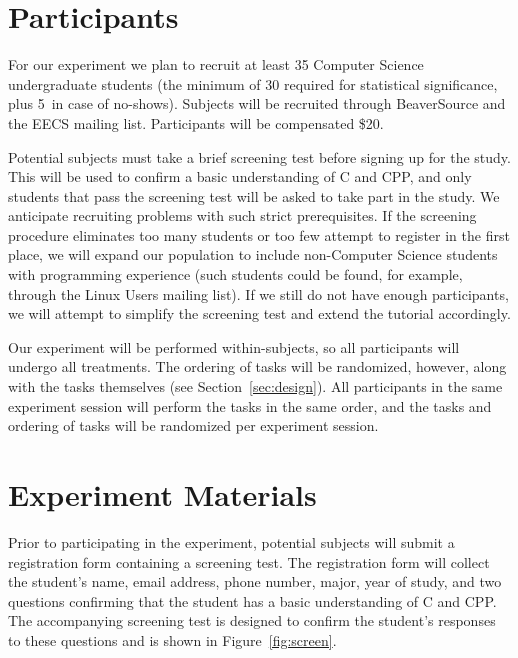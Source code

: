 \documentclass[11pt]{article}
\begin{document}
	
	\section{Participants}
	\label{sec:participants}
	
	For our experiment we plan to recruit at least 35 Computer Science
	undergraduate students (the minimum of 30 required for statistical
	significance, plus 5\ in case of no-shows).  Subjects will be recruited through
	BeaverSource and the EECS mailing list.  Participants will be compensated \$20.
	
	Potential subjects must take a brief screening test before signing up for the
	study.  This will be used to confirm a basic understanding of C and CPP, and
	only students that pass the screening test will be asked to take part in the
	study.
	We anticipate recruiting problems with such strict prerequisites.  If the
	screening procedure eliminates too many students or too few attempt to register
	in the first place, we will expand our population to include non-Computer
	Science students with programming experience (such students could be found, for
	example, through the Linux Users mailing list).  If we still do not have enough
	participants, we will attempt to simplify the screening test and extend the
	tutorial accordingly.
	
	Our experiment will be performed within-subjects, so all participants will
	undergo all treatments.  The ordering of tasks will be randomized, however,
	along with the tasks themselves (see Section~\ref{sec:design}).  All
	participants in the same experiment session will perform the tasks in the same
	order, and the tasks and ordering of tasks will be randomized per experiment session.
	
	
	\section{Experiment Materials}
	\label{sec:materials}
	
	Prior to participating in the experiment, potential subjects will submit a
	registration form containing a screening test.  The registration form will
	collect the student's name, email address, phone number, major, year of study,
	and two questions confirming that the student has a basic understanding of C
	and CPP.  The accompanying screening test is designed to confirm the student's
	responses to these questions and is shown in Figure~\ref{fig:screen}.
	
\end{document}
